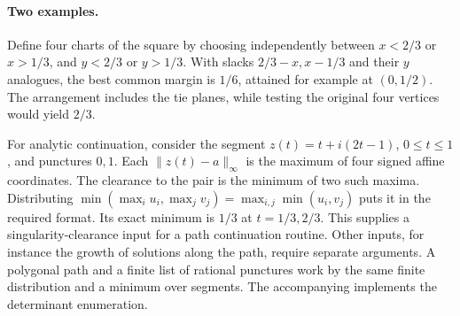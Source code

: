 \paragraph{Two examples.}
Define four charts of the square by choosing independently between $x<2/3$ or $x>1/3$, and $y<2/3$ or $y>1/3$. With slacks $2/3-x,x-1/3$ and their $y$ analogues, the best common margin is $1/6$, attained for example at $(0,1/2)$. The arrangement includes the tie planes, while testing the original four vertices would yield $2/3$.

For analytic continuation, consider the segment $z(t)=t+i(2t-1)$, $0\le t\le1$, and punctures $0,1$. Each $\|z(t)-a\|_\infty$ is the maximum of four signed affine coordinates. The clearance to the pair is the minimum of two such maxima. Distributing $\min(\max_i u_i,\max_j v_j)=\max_{i,j}\min(u_i,v_j)$ puts it in the required format. Its exact minimum is $1/3$ at $t=1/3,2/3$. This supplies a singularity-clearance input for a path continuation routine. Other inputs, for instance the growth of solutions along the path, require separate arguments. A polygonal path and a finite list of rational punctures work by the same finite distribution and a minimum over segments. The accompanying  implements the determinant enumeration.
